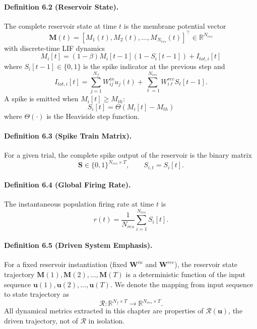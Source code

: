 \paragraph{Definition 6.2 (Reservoir State).}
The complete reservoir state at time $t$ is the membrane potential vector
\begin{equation}
\mathbf{M}(t) = [M_1(t), M_2(t), \ldots, M_{N_{res}}(t)]^{\top} \in \mathbb{R}^{N_{res}}
\end{equation}
with discrete-time LIF dynamics
\begin{equation}
M_i[t] = (1-\beta)M_i[t-1](1-S_i[t-1]) + I_{tot,i}[t]
\end{equation}
where $S_i[t-1] \in \{0,1\}$ is the spike indicator at the previous step and
\begin{equation}
I_{tot,i}[t] = \sum_{j=1}^{N_f} W^{in}_{ij}u_j(t) + \sum_{\ell=1}^{N_{res}} W^{rec}_{i\ell}S_{\ell}[t-1].
\end{equation}
A spike is emitted when $M_i[t] \ge M_{th}$:
\begin{equation}
S_i[t] = \Theta(M_i[t]-M_{th})
\end{equation}
where $\Theta(\cdot)$ is the Heaviside step function.

\paragraph{Definition 6.3 (Spike Train Matrix).}
For a given trial, the complete spike output of the reservoir is the binary matrix
\begin{equation}
\mathbf{S} \in \{0,1\}^{N_{res}\times T}, \qquad S_{i,t}=S_i[t].
\end{equation}

\paragraph{Definition 6.4 (Global Firing Rate).}
The instantaneous population firing rate at time $t$ is
\begin{equation}
r(t)=\frac{1}{N_{res}}\sum_{i=1}^{N_{res}} S_i[t].
\end{equation}

\paragraph{Definition 6.5 (Driven System Emphasis).}
For a fixed reservoir instantiation (fixed $\mathbf{W}^{in}$ and $\mathbf{W}^{rec}$), the reservoir state trajectory $\mathbf{M}(1),\mathbf{M}(2),\ldots,\mathbf{M}(T)$ is a deterministic function of the input sequence $\mathbf{u}(1),\mathbf{u}(2),\ldots,\mathbf{u}(T)$. We denote the mapping from input sequence to state trajectory as
\begin{equation}
\mathcal{R}: \mathbb{R}^{N_f \times T} \rightarrow \mathbb{R}^{N_{res} \times T}.
\end{equation}
All dynamical metrics extracted in this chapter are properties of $\mathcal{R}(\mathbf{u})$, the driven trajectory, not of $\mathcal{R}$ in isolation.

